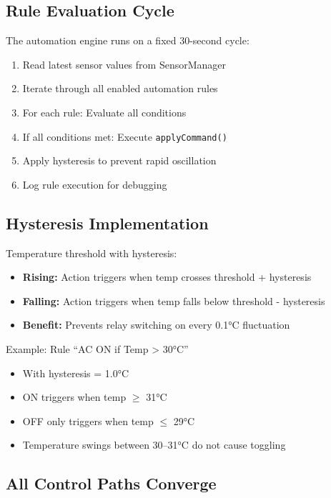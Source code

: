 \subsection{Rule Evaluation Cycle}

The automation engine runs on a fixed 30-second cycle:

\begin{enumerate}
    \item Read latest sensor values from SensorManager
    \item Iterate through all enabled automation rules
    \item For each rule: Evaluate all conditions
    \item If all conditions met: Execute \texttt{applyCommand()}
    \item Apply hysteresis to prevent rapid oscillation
    \item Log rule execution for debugging
\end{enumerate}

\subsection{Hysteresis Implementation}

Temperature threshold with hysteresis:

\begin{itemize}
    \item \textbf{Rising:} Action triggers when temp crosses threshold + hysteresis
    \item \textbf{Falling:} Action triggers when temp falls below threshold - hysteresis
    \item \textbf{Benefit:} Prevents relay switching on every 0.1°C fluctuation
\end{itemize}

Example: Rule ``AC ON if Temp > 30°C''
\begin{itemize}
    \item With hysteresis = 1.0°C
    \item ON triggers when temp $\geq$ 31°C
    \item OFF only triggers when temp $\leq$ 29°C
    \item Temperature swings between 30–31°C do not cause toggling
\end{itemize}

\subsection{All Control Paths Converge}

